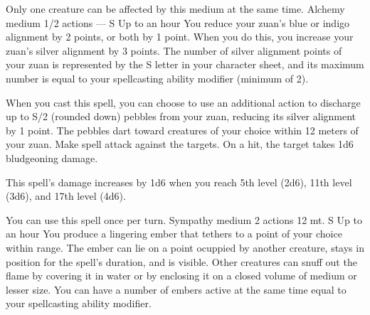     Only one creature can be affected by this medium at the same time.
    {Alchemy medium}
    {1/2 actions}
    {---}
    {S}
    {Up to an hour}
    You reduce your zuan's blue or indigo alignment by 2 points, or both by 1 point.
    When you do this, you increase your zuan's silver alignment by 3 points.
    The number of silver alignment points of your zuan is represented by the S letter in your character sheet, and its maximum number is equal to your spellcasting ability modifier (minimum of 2).

    When you cast this spell, you can choose to use an additional action to discharge up to S/2 (rounded down) pebbles from your zuan, reducing its silver alignment by 1 point.
    The pebbles dart toward creatures of your choice within 12 meters of your zuan.
    Make spell attack against the targets.
    On a hit, the target takes 1d6 bludgeoning damage.

    This spell's damage increases by 1d6 when you reach 5th level (2d6), 11th level (3d6), and 17th level (4d6).

    You can use this spell once per turn.
    {Sympathy medium}
    {2 actions}
    {12 mt.}
    {S}
    {Up to an hour}
    You produce a lingering ember that tethers to a point of your choice within range.
    The ember can lie on a point ocuppied by another creature, stays in position for the spell's duration, and is visible.
    Other creatures can snuff out the flame by covering it in water or by enclosing it on a closed volume of medium or lesser size.
    You can have a number of embers active at the same time equal to your spellcasting ability modifier.

